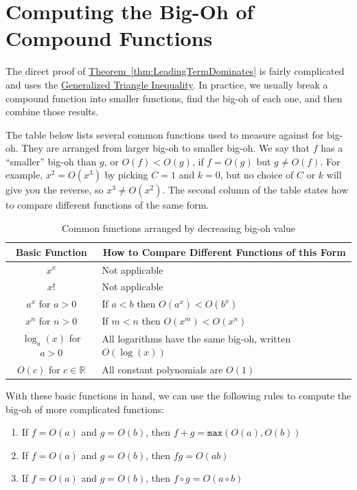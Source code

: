 \documentclass[11pt,oneside]{book}
\theoremstyle{definition}
\begin{document}
\section{Computing the Big-Oh of Compound Functions}
The direct proof of \hyperref[thm:LeadingTermDominates]{Theorem~\ref*{thm:LeadingTermDominates}} is fairly complicated and uses the \hyperref[lem:GeneralizedTriangleInequality]{Generalized Triangle Inequality}.
In practice, we usually break a compound function into smaller functions, find the big-oh of each one, and then combine those results.

The table below lists several common functions used to measure against for big-oh.
They are arranged from larger big-oh to smaller big-oh.
We say that $f$ has a ``smaller'' big-oh than $g$, or $O(f) < O(g)$, if $f = O(g)$ but $g \neq O(f)$.
For example, $x^{2} = O(x^{3})$ by picking $C = 1$ and $k = 0$, but no choice of $C$ or $k$ will give you the reverse, so $x^{3} \neq O(x^{2})$.
The second column of the table states how to compare different functions of the same form.

\begin{table}[H]
\centering
\begin{tabular}{|c|l|}
    \multicolumn{1}{c}{Basic Function} & \multicolumn{1}{c}{How to Compare Different Functions of this Form} \\
    \hline
    $x^{x}$ & Not applicable \\
    \hline
    $x!$ & Not applicable \\
    \hline
    $a^{x}$ for $a > 0$ & If $a < b$ then $O(a^{x}) < O(b^{x})$ \\
    \hline
    $x^{n}$ for $n > 0$ & If $m < n$ then $O(x^{m}) < O(x^{n})$ \\
    \hline
    $\log_{a}(x)$ for $a > 0$ & All logarithms have the same big-oh, written $O(\log(x))$ \\
    \hline
    $O(c)$ for $c \in \mathbb{R}$ & All constant polynomials are $O(1)$ \\
    \hline
\end{tabular}
\caption{Common functions arranged by decreasing big-oh value} \label{tab:BigOhFunctions}
\end{table}

With these basic functions in hand, we can use the following rules to compute the big-oh of more complicated functions:

\begin{enumerate}
    \item If $f = O(a)$ and $g = O(b)$, then $f + g = \texttt{max}(O(a), O(b))$

    \item If $f = O(a)$ and $g = O(b)$, then $fg = O(ab)$

    \item If $f = O(a)$ and $g = O(b)$, then $f \circ g = O(a \circ b)$
\end{enumerate}
\end{document}
